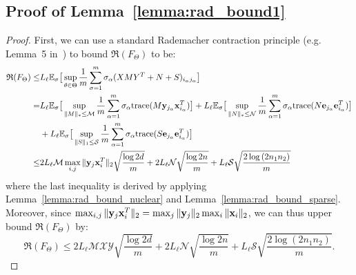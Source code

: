\documentclass[twoside,11pt]{article}
\def\be{{\bf e}}
\def\bx{{\bf x}}
\def\by{{\bf y}}
\newcommand\Ex[2]{{\mathbb E}_{#1}\big[#2\big]}
\newcommand\trace[1]{{\operatorname{trace}}(#1)}
\def\mmax{{\mathcal M}}
\def\nmax{{\mathcal N}}
\def\smax{{\mathcal S}}
\def\xmax{{\mathcal X}}
\def\ymax{{\mathcal Y}}
\def\rad{{\mathfrak R}}
\begin{document}
\subsection*{Proof of Lemma~\ref{lemma:rad_bound1}}
\begin{proof}
First, we can use a standard Rademacher contraction principle (e.g. Lemma~5 in~\citealp{RM03a})
to bound
$\rad(F_\Theta)$ to be:
\begin{align*}
  \rad(F_{\Theta}) \leq&
L_\ell \Ex{\sigma}{\sup_{\theta\in\Theta} \frac{1}{m} \sum_{\sigma=1}^m
  \sigma_{\alpha}(XMY^T+N+S)_{i_\alpha j_\alpha}} \nonumber \\
    =&
    L_\ell \Ex{\sigma}{\sup_{\|M\|_*\leq\mmax} \frac{1}{m}\sum_{\alpha=1}^m
              \sigma_{\alpha}\trace{M\by_{j_\alpha}\bx_{i_\alpha}^T}}
    + L_\ell\Ex{\sigma}{\sup_{\|N\|_*\leq\nmax} \frac{1}{m}\sum_{\alpha=1}^m
      \sigma_{\alpha}\trace{N\be_{j_\alpha}\be_{i_\alpha}^T}}\\
    &+ L_\ell\Ex{\sigma}{\sup_{\|S\|_1\leq\smax} \frac{1}{m}\sum_{\alpha=1}^m
      \sigma_{\alpha}\trace{S\be_{j_\alpha}\be_{i_\alpha}^T}}\\
    \leq&
    2L_\ell\mmax\max_{i,j}\|\by_j\bx_i^T\|_2 \sqrt{\frac{\log{2d}}{m}}
    + 2L_\ell\nmax \sqrt{\frac{\log{2n}}{m}} + L_\ell\smax \sqrt{\frac{2\log{(2n_1n_2)}}{m}}
    \end{align*}
    where the last inequality is derived by applying Lemma~\ref{lemma:rad_bound_nuclear} and Lemma~\ref{lemma:rad_bound_sparse}.
    Moreover, since $\max_{i,j} \|\by_j\bx_i^T\|_2 = \max_j \|\by_j\|_2
    \max_i\|\bx_i\|_2$, we can thus upper bound $\rad(F_{\Theta})$ by:
    \begin{equation}
      {\rad(F_{\Theta})} \leq 2L_\ell \mmax \xmax \ymax \sqrt{\frac{\log{2d}}{m}}
    +2L_\ell\nmax \sqrt{\frac{\log{2n}}{m}}
    +L_\ell\smax \sqrt{\frac{2\log{(2n_1n_2)}}{m}}.
    \label{eq:first_rad_bound}
    \end{equation}


\end{proof}
\end{document}
